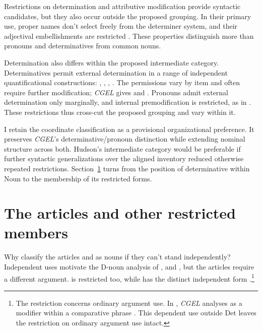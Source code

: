 \documentclass[12pt]{article}
\begin{document}
Restrictions on determination and attributive modification provide syntactic candidates, but they also occur outside the proposed grouping. In their primary use, proper names don't select freely from the determiner system, and their adjectival embellishments are restricted \citep[517, 519--520]{huddleston2002}. These properties distinguish more than pronouns and determinatives from common nouns.

Determination also differs within the proposed intermediate category. Determinatives permit external determination in a range of independent quantificational constructions: , , , . The permissions vary by item and often require further modification; \textit{CGEL} gives  and  \citep[415--416]{huddleston2002}. Pronouns admit external determination only marginally, and internal premodification is restricted, as in  \citep[429--430]{huddleston2002}. These restrictions thus cross-cut the proposed grouping and vary within it.

I retain the coordinate classification as a provisional organizational preference. It preserves \textit{CGEL}'s determinative/pronoun distinction while extending nominal structure across both. Hudson's intermediate category would be preferable if further syntactic generalizations over the aligned inventory reduced otherwise repeated restrictions. Section~\ref{sec:articles} turns from the position of determinative within Noun to the membership of its restricted forms.

\section{The articles and other restricted members}\label{sec:articles}

Why classify the articles  and  as nouns if they can't stand independently? Independent uses motivate the D-noun analysis of ,  and , but the articles require a different argument.  is restricted too, while  has the distinct independent form  \citep[371--372, 410--411]{huddleston2002}.\footnote{The restriction concerns ordinary argument use. In , \textit{CGEL} analyses  as a modifier within a comparative phrase \citep[1131--1132, 1135--1136]{huddleston2002}. This dependent use outside Det leaves the restriction on ordinary argument use intact.}
\end{document}
